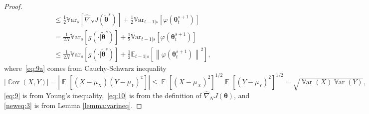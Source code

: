 \documentclass{article}
\theoremstyle{remark}
\theoremstyle{definition}
\newcommand{\transpose}[1]{{#1}^\texttt{T}}
\DeclareMathOperator*{\EV}{\mathbb{E}}
\DeclareMathOperator*{\Cov}{\mathbb{C}ov}
\DeclareMathOperator*{\Var}{\mathbb{V}ar}
\newcommand{\EVV}[2][\ppvect \in \ppspace]{\EV_{#1}\left[{#2}\right]}
\newcommand{\norm}[2][\infty]{\left\|#2\right\|_{#1}}
\newcommand{\vtheta}{\boldsymbol{\theta}}
\newcommand{\gradApp}[2]{\widehat{\nabla}_{#2}J(#1)}
\newcommand{\Ets}[2][t]{\mathbb{E}_{#1\vert s}\left[#2\right]}
\newcommand{\Varts}[2][t]{{\mathbb{V}\text{ar}}_{#1\vert s}\left[#2\right]}
\newcommand{\Vars}[1]{{\mathbb{V}\text{ar}}_{s}\left[#1\right]}
\newcommand{\wt}[1]{\widetilde{#1}}
\begin{document}
\begin{proof}
\begin{align}
	&\leq	
	\frac{1}{2}\Vars{\gradApp{\wt{\vtheta}^s}{N}} +\frac{1}{2}\Varts[t-1]{\varphi(\vtheta_t^{s+1})}\label{eq:9}\\
	&=
	\frac{1}{2N}\Vars{g(\cdot\vert\wt{\vtheta}^s)} +\frac{1}{2}\Varts[t-1]{\varphi(\vtheta_t^{s+1})} \label{eq:10}\\
	&\leq
	\frac{1}{2N}\Vars{g(\cdot\vert\wt{\vtheta}^s)} +\frac{1}{2}\Ets[t-1]{\norm[]{\varphi(\vtheta_t^{s+1})}^2},
	\label{neweq:3}
\end{align}
where~\eqref{eq:9a} comes from Cauchy-Schwarz inequality
\[
        |\Cov(X,Y)| = |\EVV[]{(X-\mu_X)\transpose{(Y-\mu_Y)}}| \leq \EVV[]{(X-\mu_X)^2}^{1/2}\EVV[]{(Y-\mu_Y)^2}^{1/2} = \sqrt{\Var(X) \Var(Y)},
\]
\eqref{eq:9} is from Young's inequality,~\eqref{eq:10} is from the definition of $\gradApp{\vtheta}{N}$, and \eqref{neweq:3} is from Lemma \ref{lemma:varineq}.
\end{proof}
\end{document}
